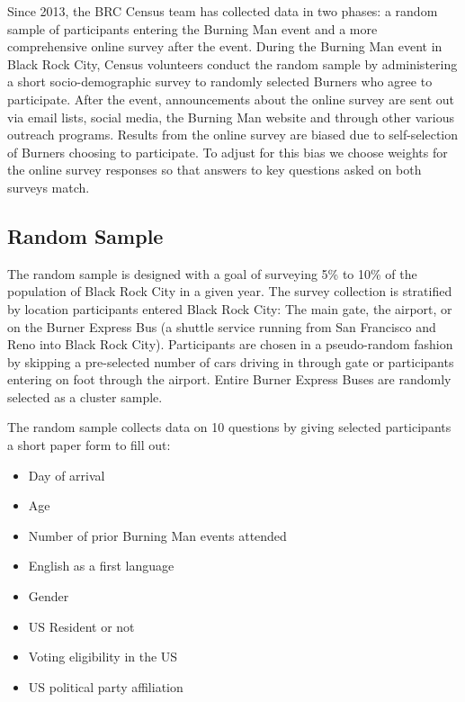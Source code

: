 \documentclass[
]{book}
\providecommand{\tightlist}{%
  \setlength{\itemsep}{0pt}\setlength{\parskip}{0pt}}
\begin{document}
Since 2013, the BRC Census team has collected data in two phases: a random
sample of participants entering the Burning Man event and a more comprehensive
online survey after the event. During the Burning Man event in Black Rock City,
Census volunteers conduct the random sample by administering a short
socio-demographic survey to randomly selected Burners who agree to participate.
After the event, announcements about the online survey are sent out via email
lists, social media, the Burning Man website and through other various
outreach programs. Results from the online survey are biased due to
self-selection of Burners choosing to participate. To adjust for this bias
we choose weights for the online survey responses so that answers to key questions
asked on both surveys match.

\hypertarget{random-sample}{%
\subsection{Random Sample}\label{random-sample}}

The random sample is designed with a goal of surveying 5\% to 10\% of the population
of Black Rock City in a given year. The survey collection is stratified by
location participants entered Black Rock City: The main gate, the airport, or
on the Burner Express Bus (a shuttle service running from San Francisco and
Reno into Black Rock City). Participants are chosen in a pseudo-random fashion
by skipping a pre-selected number of cars driving in through gate or
participants entering on foot through the airport. Entire Burner Express Buses
are randomly selected as a cluster sample.

The random sample collects data on 10 questions by giving selected participants
a short paper form to fill out:

\begin{itemize}
\tightlist
\item
  Day of arrival
\item
  Age
\item
  Number of prior Burning Man events attended
\item
  English as a first language
\item
  Gender
\item
  US Resident or not
\item
  Voting eligibility in the US
\item
  US political party affiliation
\end{itemize}
\end{document}
